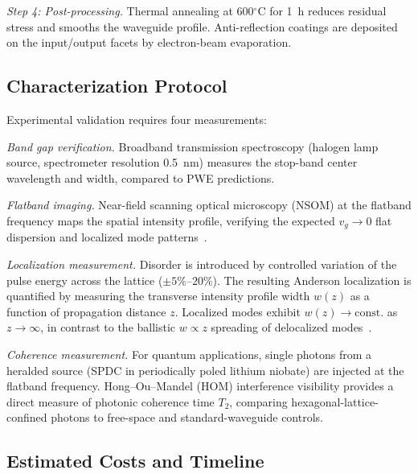 \documentclass[10pt,letterpaper]{article}
\begin{document}
\textit{Step 4: Post-processing.} Thermal annealing at 600$^\circ$C for 1~h reduces residual stress and smooths the waveguide profile. Anti-reflection coatings are deposited on the input/output facets by electron-beam evaporation.

\subsection{Characterization Protocol}

Experimental validation requires four measurements:

\textit{Band gap verification.} Broadband transmission spectroscopy (halogen lamp source, spectrometer resolution 0.5~nm) measures the stop-band center wavelength and width, compared to PWE predictions.

\textit{Flatband imaging.} Near-field scanning optical microscopy (NSOM) at the flatband frequency maps the spatial intensity profile, verifying the expected $v_g \to 0$ flat dispersion and localized mode patterns~\cite{Lustig2019}.

\textit{Localization measurement.} Disorder is introduced by controlled variation of the pulse energy across the lattice ($\pm 5\%$--$20\%$). The resulting Anderson localization is quantified by measuring the transverse intensity profile width $w(z)$ as a function of propagation distance $z$. Localized modes exhibit $w(z) \to \mathrm{const.}$ as $z \to \infty$, in contrast to the ballistic $w \propto z$ spreading of delocalized modes~\cite{Pertsch2002,Wiersma1997}.

\textit{Coherence measurement.} For quantum applications, single photons from a heralded source (SPDC in periodically poled lithium niobate) are injected at the flatband frequency. Hong--Ou--Mandel (HOM) interference visibility provides a direct measure of photonic coherence time $T_2$, comparing hexagonal-lattice-confined photons to free-space and standard-waveguide controls.

\subsection{Estimated Costs and Timeline}
\end{document}
